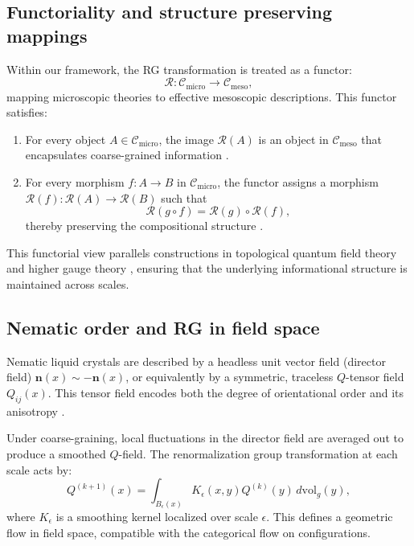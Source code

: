 	\subsection{Functoriality and structure preserving mappings}
	
	Within our framework, the RG transformation is treated as a functor:
	\[
	\mathcal{R}: \mathcal{C}_{\text{micro}} \to \mathcal{C}_{\text{meso}},
	\]
	mapping microscopic theories to effective mesoscopic descriptions. This functor satisfies:
	\begin{enumerate}[label=(\alph*)]
		\item For every object \(A \in \mathcal{C}_{\text{micro}}\), the image \(\mathcal{R}(A)\) is an object in \(\mathcal{C}_{\text{meso}}\) that encapsulates coarse-grained information \cite{spivak2014category}.
		\item For every morphism \(f: A \to B\) in \(\mathcal{C}_{\text{micro}}\), the functor assigns a morphism \(\mathcal{R}(f): \mathcal{R}(A) \to \mathcal{R}(B)\) such that
		\[
		\mathcal{R}(g \circ f) = \mathcal{R}(g) \circ \mathcal{R}(f),
		\]
		thereby preserving the compositional structure \cite{atiyah1988topological, segal2004definition}.
	\end{enumerate}
	
	This functorial view parallels constructions in topological quantum field theory \cite{freed1995chern} and higher gauge theory \cite{baez2007higher}, ensuring that the underlying informational structure is maintained across scales.
	
	\subsection{Nematic order and RG in field space}
	
	Nematic liquid crystals are described by a headless unit vector field (director field) \( \mathbf{n}(x) \sim -\mathbf{n}(x) \), or equivalently by a symmetric, traceless \(Q\)-tensor field \( Q_{ij}(x) \). This tensor field encodes both the degree of orientational order and its anisotropy \cite{degennes1993physics}.

	Under coarse-graining, local fluctuations in the director field are averaged out to produce a smoothed \(Q\)-field. The renormalization group transformation at each scale acts by:
	\[
	Q^{(k+1)}(x) = \int_{B_\epsilon(x)} K_\epsilon(x,y) Q^{(k)}(y) \, d\mathrm{vol}_{g}(y),
	\]
	where \(K_\epsilon\) is a smoothing kernel localized over scale \(\epsilon\). This defines a geometric flow in field space, compatible with the categorical flow on configurations.

